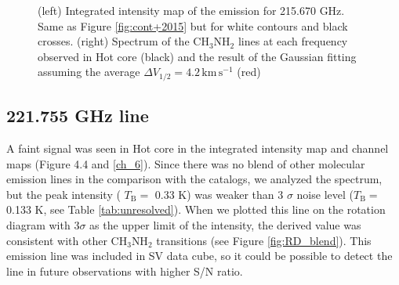 \begin{figure}[htp]
\begin{center}
\begin{minipage}{0.98\textwidth}
\begin{center}
\begin{minipage}{0.48\textwidth}
\begin{center}
\label{fig:215spec}
\end{center}
\end{minipage}
\end{center}
\end{minipage}
\label{fig:215data}
\caption{(left) Integrated intensity map of the emission for 215.670 GHz. Same as Figure \ref{fig:cont+2015} but for white contours and black crosses. (right) Spectrum of the CH$_3$NH$_2$ lines at each frequency observed in Hot core (black)  and the result of the Gaussian fitting assuming the average $\Delta V_{1/2} = 4.2\, \mathrm{km\,s^{-1}}$ (red)}
\end{center}
\label{fig:215data}
\end{figure}

\subsection*{221.755 GHz line}
A faint signal was seen in Hot core in the integrated intensity map and channel maps (Figure 4.4 and \ref{ch_6}).
Since there was no blend of other molecular emission lines in the comparison with the catalogs, we analyzed the spectrum, 
but the peak intensity ( $T_{\mathrm{B}}=$ 0.33 K) was weaker than 
3 $\sigma $ noise level ($T_{\mathrm{B}}=$ 0.133 K, see Table \ref{tab:unresolved}). 
When we plotted this line on the rotation diagram with 3$\sigma$ as the upper limit of the intensity, 
the derived value was consistent with other CH$_3$NH$_2$ transitions (see Figure \ref{fig:RD_blend}). 
This emission line was included in SV data cube, 
so it could be possible to detect the line in future observations with higher S/N ratio.

